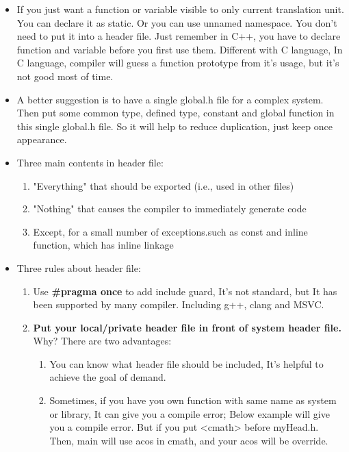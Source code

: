 \documentclass[a4paper,11pt,twoside]{book}
\begin{document}
\begin{itemize}
	\item If you just want a function or variable visible to only current translation unit. You can declare it as static. Or you can use unnamed namespace.  You don't need to put it into a header file.  Just remember in C++, you have to declare function and variable before you first use them. Different with C language, In C language, compiler will guess a function prototype from it's usage, but it's not good most of time.
	

	\item A better suggestion is to have a single global.h file for a complex system. Then put some common type, defined type, constant and global function in this single global.h file. So it will help to reduce duplication, just keep once appearance.
	
	\item Three main contents in header file:
	\begin{enumerate}
		\item "Everything" that should be exported (i.e., used in other files)
		
		\item "Nothing" that causes the compiler to immediately generate code
		
		\item Except, for a small number of exceptions.such as const and inline function, which has inline linkage
	\end{enumerate}
	
	\item Three rules about header file:
	
	\begin{enumerate}
		\item Use \textbf{\#pragma once} to add include guard, It's not standard, but It has been supported by many compiler. Including g++, clang and MSVC.
		
		\item \textbf{Put your local/private header file in front of system header file. }  Why? There are two advantages:
		\begin{enumerate}
			\item You can know what header file should be included, It's helpful to achieve the goal of demand.
			
			\item Sometimes, if you have you own function with same name as system or library, It can give you a compile error; Below example will give you a compile error. But if you put <cmath> before myHead.h. Then, main will use acos in cmath, and your acos will be override.
		\end{enumerate}
		

\end{enumerate}
\end{itemize}
\end{document}
